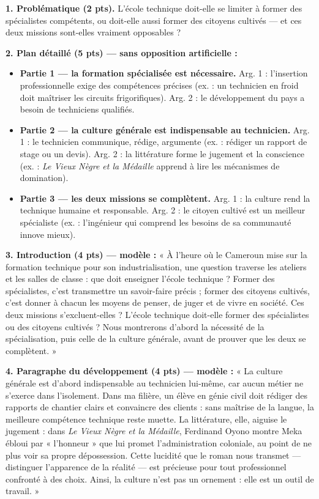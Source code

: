 \documentclass[11pt]{article}
\begin{document}
\begin{corrige}
\textbf{1. Problématique (2 pts).} L'école technique doit-elle se limiter à former des spécialistes compétents, ou doit-elle aussi former des citoyens cultivés — et ces deux missions sont-elles vraiment opposables ?

\textbf{2. Plan détaillé (5 pts) — sans opposition artificielle :}
\begin{itemize}
\item \textbf{Partie 1 — la formation spécialisée est nécessaire.} Arg. 1 : l'insertion professionnelle exige des compétences précises (ex. : un technicien en froid doit maîtriser les circuits frigorifiques). Arg. 2 : le développement du pays a besoin de techniciens qualifiés.
\item \textbf{Partie 2 — la culture générale est indispensable au technicien.} Arg. 1 : le technicien communique, rédige, argumente (ex. : rédiger un rapport de stage ou un devis). Arg. 2 : la littérature forme le jugement et la conscience (ex. : \emph{Le Vieux Nègre et la Médaille} apprend à lire les mécanismes de domination).
\item \textbf{Partie 3 — les deux missions se complètent.} Arg. 1 : la culture rend la technique humaine et responsable. Arg. 2 : le citoyen cultivé est un meilleur spécialiste (ex. : l'ingénieur qui comprend les besoins de sa communauté innove mieux).
\end{itemize}

\textbf{3. Introduction (4 pts) — modèle :} « À l'heure où le Cameroun mise sur la formation technique pour son industrialisation, une question traverse les ateliers et les salles de classe : que doit enseigner l'école technique ? Former des spécialistes, c'est transmettre un savoir-faire précis ; former des citoyens cultivés, c'est donner à chacun les moyens de penser, de juger et de vivre en société. Ces deux missions s'excluent-elles ? L'école technique doit-elle former des spécialistes ou des citoyens cultivés ? Nous montrerons d'abord la nécessité de la spécialisation, puis celle de la culture générale, avant de prouver que les deux se complètent. »

\textbf{4. Paragraphe du développement (4 pts) — modèle :} « La culture générale est d'abord indispensable au technicien lui-même, car aucun métier ne s'exerce dans l'isolement. Dans ma filière, un élève en génie civil doit rédiger des rapports de chantier clairs et convaincre des clients : sans maîtrise de la langue, la meilleure compétence technique reste muette. La littérature, elle, aiguise le jugement : dans \emph{Le Vieux Nègre et la Médaille}, Ferdinand Oyono montre Meka ébloui par « l'honneur » que lui promet l'administration coloniale, au point de ne plus voir sa propre dépossession. Cette lucidité que le roman nous transmet — distinguer l'apparence de la réalité — est précieuse pour tout professionnel confronté à des choix. Ainsi, la culture n'est pas un ornement : elle est un outil de travail. »


\end{corrige}
\end{document}
